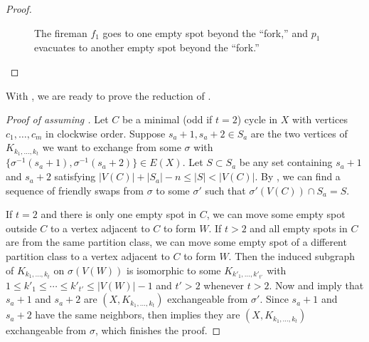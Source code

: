\documentclass{mystyle}
\begin{document}
\begin{proof}
\begin{enumerate}
\begin{figure}[ht]
            \caption{The fireman $f_1$ goes to one empty spot beyond the ``fork,'' and $p_1$ evacuates to another empty spot beyond the ``fork.''}
            \label{fig_6}
        \end{figure}
    \end{enumerate}
\end{proof}

With , we are ready to prove the reduction of . 
\begin{proof}[Proof of  assuming ]
    Let $C$ be a minimal (odd if $t = 2$) cycle in $X$ with vertices $c_1, \ldots, c_{m}$ in clockwise order. Suppose $s_a + 1, s_a + 2 \in S_a$ are the two vertices of $K_{k_1, \ldots, k_t}$ we want to exchange from some $\sigma$ with $\{\sigma^{-1}(s_a + 1), \sigma^{-1}(s_a + 2)\} \in E(X)$. Let $S \subset S_a$ be any set containing $s_a + 1$ and $s_a + 2$ satisfying $|V(C)| + |S_a| - n \leq |S| < |V(C)|$. By , we can find a sequence of friendly swaps from $\sigma$ to some $\sigma'$ such that $\sigma'(V(C)) \cap S_a = S$. 
    
    If $t = 2$ and there is only one empty spot in $C$, we can move some empty spot outside $C$ to a vertex adjacent to $C$ to form $W$. If $t > 2$ and all empty spots in $C$ are from the same partition class, we can move some empty spot of a different partition class to a vertex adjacent to $C$ to form $W$. Then the induced subgraph of $K_{k_1, \ldots, k_t}$ on $\sigma(V(W))$ is isomorphic to some $K_{k'_1, \ldots, k'_{t'}}$ with $1 \leq k'_1 \leq \cdots \leq k'_{t'} \leq |V(W)| - 1$ and $t' > 2$ whenever $t > 2$. Now  and  imply that $s_a + 1$ and $s_a + 2$ are $(X, K_{k_1, \ldots, k_t})$ exchangeable from $\sigma'$. Since $s_a + 1$ and $s_a + 2$ have the same neighbors,  then implies they are $(X, K_{k_1, \ldots, k_t})$ exchangeable from $\sigma$, which finishes the proof.   
\end{proof}
\end{document}
